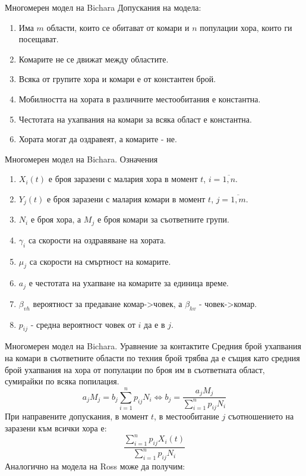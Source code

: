 \begin{frame}[t]{Многомерен модел на Bichara}
  Допускания на модела:
  \begin{enumerate}
    \item Има $m$ области, които се обитават от комари и $n$ популации хора, които ги посещават.
    \item Комарите не се движат между областите.
    \item Всяка от групите хора и комари е от константен брой.
    \item Мобилността на хората в различните местообитания е константна.
    \item Честотата на ухапвания на комари за всяка област е константна.
    \item Хората могат да оздравеят, а комарите - не.
  \end{enumerate}
\end{frame}

\begin{frame}[t]{Многомерен модел на Bichara. Означения}
  \begin{enumerate}
    \item $X_i(t)$ е броя заразени с малария хора в момент $t$, $i=\overline{1,n}$.
    \item $Y_j(t)$ е броя заразени с малария комари в момент $t$, $j=\overline{1,m}$.
    \item $N_i$ е броя хора, а $M_j$ е броя комари за съответните групи.
    \item $\gamma_i$ са скорости на оздравяване на хората.
    \item $\mu_j$ са скорости на смъртност на комарите.
    \item $a_j$ е честотата на ухапване на комарите за единица време.
    \item $\beta_{vh}$ вероятност за предаване комар->човек, а $\beta_{hv}$ - човек->комар.
    \item $p_{ij}$ - средна вероятност човек от $i$ да е в $j$.
  \end{enumerate}
\end{frame}

\begin{frame}[t]{Многомерен модел на Bichara. Уравнение за контактите}
  Средния брой ухапвания на комари в съответните области по техния брой трябва да е същия като средния брой ухапвания на хора от популации по броя им в съответната област, сумирайки по всяка попилация.
  \begin{equation}
    a_j M_j = b_j \sum_{i=1}^n p_{ij} N_i \iff b_j = \frac{a_j M_j}{\sum_{i=1}^n p_{ij} N_i}
  \end{equation}
  При направените допускания, в момент $t$, в местообитание $j$ съотношението на заразени към всички хора е:
  \begin{equation}
    \frac{\sum_{i=1}^n p_{ij} X_i(t)}{\sum_{i=1}^n p_{ij} N_i}
  \end{equation}
  Аналогично на модела на Ross може да получим:
\end{frame}

